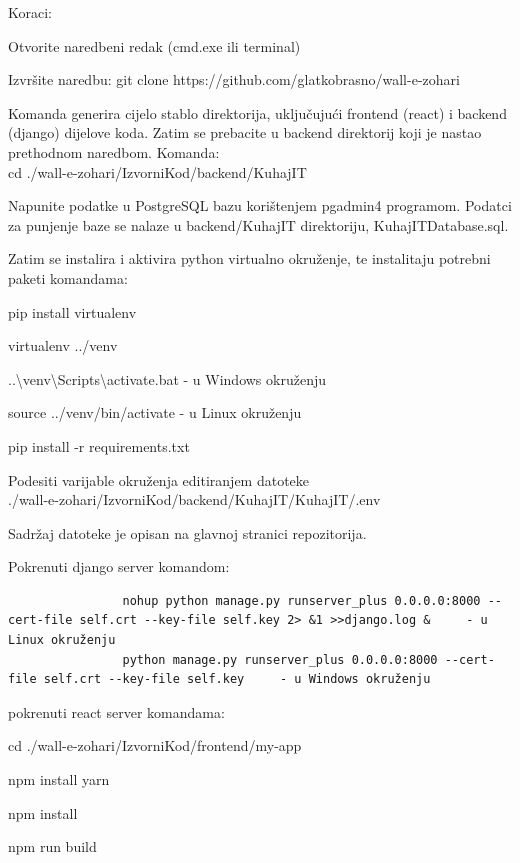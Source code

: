 			Koraci:
			\begin{packed_enum}
				\item Otvorite naredbeni redak (cmd.exe ili terminal)
				\item Izvršite naredbu: git clone https://github.com/glatkobrasno/wall-e-zohari
				\item Komanda generira cijelo stablo direktorija, uključujući frontend (react) i backend (django) dijelove koda.
				Zatim se prebacite u backend direktorij koji je nastao prethodnom naredbom. Komanda: \\ cd  ./wall-e-zohari/IzvorniKod/backend/KuhajIT
				\item Napunite podatke u PostgreSQL bazu korištenjem pgadmin4 programom. Podatci za punjenje baze se nalaze u backend/KuhajIT direktoriju, KuhajITDatabase.sql. 
				\item Zatim se instalira i aktivira python virtualno okruženje, te instalitaju potrebni paketi komandama:
				\item[] \begin{packed_enum}
				    \item pip install virtualenv
				    \item virtualenv ../venv
     				\item ..\textbackslash venv\textbackslash Scripts\textbackslash activate.bat - u Windows okruženju
      				\item source ../venv/bin/activate - u Linux okruženju

				    \item pip install -r requirements.txt	
				\end{packed_enum}
				\item Podesiti varijable okruženja editiranjem datoteke \\ ./wall-e-zohari/IzvorniKod/backend/KuhajIT/KuhajIT/.env
				\item Sadržaj datoteke je opisan na glavnoj stranici repozitorija.
			     \item Pokrenuti django server komandom: 
				\item[] \begin{verbatim}
				nohup python manage.py runserver_plus 0.0.0.0:8000 --cert-file self.crt --key-file self.key 2> &1 >>django.log &     - u Linux okruženju
				python manage.py runserver_plus 0.0.0.0:8000 --cert-file self.crt --key-file self.key     - u Windows okruženju
				\end{verbatim}
			     \item pokrenuti react server komandama:
			     \item[] \begin{packed_enum}
			     	\item cd ./wall-e-zohari/IzvorniKod/frontend/my-app
			     	\item npm install yarn
			     	\item npm install
			     	\item npm run build
			     	

\end{packed_enum}
\end{packed_enum}
